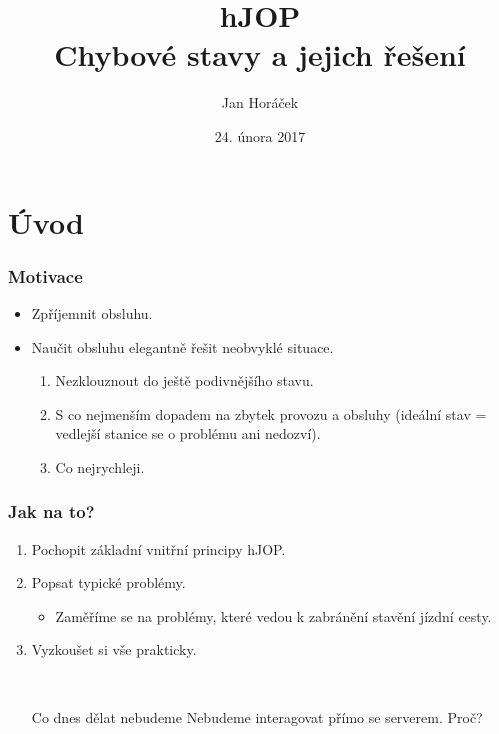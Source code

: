 \documentclass[czech]{beamer}
\title[hJOP]{\normalsize hJOP\\\Large Chybové stavy a jejich řešení} %
\author{Jan Horáček} %
\institute[KMŽ Brno I] %
{
Klub modelářů železnic Brno I \\ %
\medskip
\textit{jan.horacek@kmz-brno.cz} %
}
\date{24. února 2017} %
\begin{document}
\begin{frame}
\titlepage %
\end{frame}


\section{Úvod}

\begin{frame}
\frametitle{Motivace}
\begin{itemize}
\item Zpříjemnit obsluhu.
\item Naučit obsluhu elegantně řešit neobvyklé situace.
	\begin{enumerate}
	\item Nezklouznout do ještě podivnějšího stavu.
	\item S co nejmenším dopadem na zbytek provozu a obsluhy (ideální stav =
	vedlejší stanice se o problému ani nedozví).
	\item Co nejrychleji.
	\end{enumerate}
\end{itemize}
\end{frame}


\begin{frame}
\frametitle{Jak na to?}
\begin{enumerate}
\item Pochopit základní vnitřní principy hJOP.
\item Popsat typické problémy.
	\begin{itemize}
	\item Zaměříme se na problémy, které vedou k zabránění stavění jízdní cesty.
	\end{itemize}
\item Vyzkoušet si vše prakticky.

\pause
~\\

\begin{block}{Co dnes dělat nebudeme}
Nebudeme interagovat přímo se serverem. Proč?
\end{block}

\end{enumerate}
\end{frame}
\end{document}
